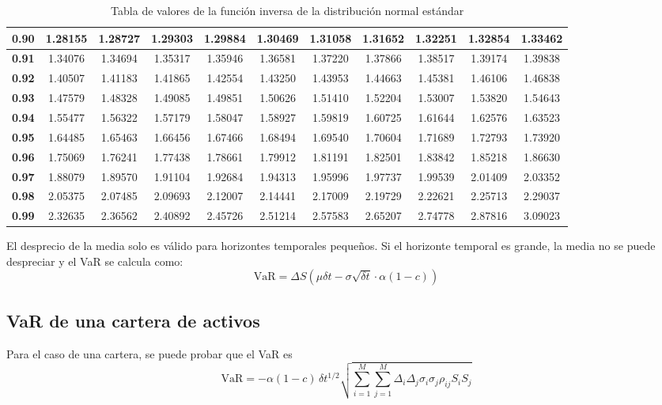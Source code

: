 \begin{table}[H]
\begin{tabular}{|c|c|c|c|c|c|c|c|c|c|c|}
        \hline
        \textbf{0.90} & 1.28155 & 1.28727 & 1.29303 & 1.29884 & 1.30469 & 1.31058 & 1.31652 & 1.32251 & 1.32854 & 1.33462 \\
        \hline
        \textbf{0.91} & 1.34076 & 1.34694 & 1.35317 & 1.35946 & 1.36581 & 1.37220 & 1.37866 & 1.38517 & 1.39174 & 1.39838 \\
        \hline
        \textbf{0.92} & 1.40507 & 1.41183 & 1.41865 & 1.42554 & 1.43250 & 1.43953 & 1.44663 & 1.45381 & 1.46106 & 1.46838 \\
        \hline
        \textbf{0.93} & 1.47579 & 1.48328 & 1.49085 & 1.49851 & 1.50626 & 1.51410 & 1.52204 & 1.53007 & 1.53820 & 1.54643 \\
        \hline
        \textbf{0.94} & 1.55477 & 1.56322 & 1.57179 & 1.58047 & 1.58927 & 1.59819 & 1.60725 & 1.61644 & 1.62576 & 1.63523 \\
        \hline
        \textbf{0.95} & 1.64485 & 1.65463 & 1.66456 & 1.67466 & 1.68494 & 1.69540 & 1.70604 & 1.71689 & 1.72793 & 1.73920 \\
        \hline
        \textbf{0.96} & 1.75069 & 1.76241 & 1.77438 & 1.78661 & 1.79912 & 1.81191 & 1.82501 & 1.83842 & 1.85218 & 1.86630 \\
        \hline
        \textbf{0.97} & 1.88079 & 1.89570 & 1.91104 & 1.92684 & 1.94313 & 1.95996 & 1.97737 & 1.99539 & 2.01409 & 2.03352 \\
        \hline
        \textbf{0.98} & 2.05375 & 2.07485 & 2.09693 & 2.12007 & 2.14441 & 2.17009 & 2.19729 & 2.22621 & 2.25713 & 2.29037 \\
        \hline
        \textbf{0.99} & 2.32635 & 2.36562 & 2.40892 & 2.45726 & 2.51214 & 2.57583 & 2.65207 & 2.74778 & 2.87816 & 3.09023 \\
        \hline
    \end{tabular}
    \caption{Tabla de valores de la función inversa de la distribución normal estándar}
    \label{tab:inv_norm_table}
\end{table}



El desprecio de la media solo es válido para horizontes temporales pequeños. Si el horizonte temporal es grande, la media no se puede despreciar y el VaR se calcula como:
\[
    \boxed{\text{VaR} = \Delta S \left( \mu \delta t - \sigma \sqrt{\delta t} \cdot \alpha(1-c) \right)}
\]





\subsection{VaR de una cartera de activos}
Para el caso de una cartera, se puede probar que el VaR es
\[
    \boxed{\text{VaR} = -\alpha (1-c) \, \delta t^{1/2} \sqrt{ \sum_{i=1}^{M} \sum_{j=1}^{M} \Delta_i \Delta_j \sigma_i \sigma_j \rho_{ij} S_i S_j }}
\]





